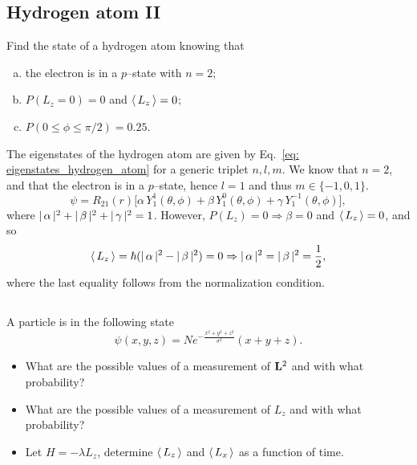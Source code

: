 \subsection{Hydrogen atom II}
Find the state of a hydrogen atom knowing that
\begin{enumerate}[(a)]
    \item the electron is in a $p$--state with $n=2$;
    \item $P(L_z = 0) = 0$ and $\langle \, L_z \, \rangle = 0$;
    \item $P(0 \le \phi \le \pi/2) = 0.25$.
\end{enumerate}
The eigenstates of the hydrogen atom are given by Eq.~\eqref{eq: eigenstates_hydrogen_atom} for a generic triplet $n, l, m$. We know that $n=2$, and that the electron is in a $p$--state, hence $l=1$ and thus $ m \in \{ -1, 0, 1 \} $. 
\begin{equation}
    \psi = R_{21} (r) \bigl[ \alpha \, Y_1^1 (\theta, \phi) + \beta \, Y_1^0 (\theta, \phi) + \gamma \, Y_1^{-1} (\theta, \phi) \bigr],
\end{equation}
where $|\, \alpha \,|^2 + |\, \beta \,|^2 + |\, \gamma \,|^2 = 1$.
However, $P(L_z) = 0 \Rightarrow \beta = 0$ and $ \langle \, L_z \, \rangle = 0 $, and so
\begin{equation}
    \langle \, L_z \, \rangle = \hbar ( |\, \alpha \,|^2 - |\, \beta \,|^2 ) = 0 \Rightarrow |\, \alpha \,|^2 = |\, \beta \,|^2 = \frac{1}{2},
\end{equation}
where the last equality follows from the normalization condition.
\subsection{}
A particle is in the following state
\begin{equation}
    \psi(x, y, z) = N e^{- \frac{x^2 + y^2 + z^2}{\sigma^2} } (x + y + z).
\end{equation}
\begin{itemize}[(a)]
    \item What are the possible values of a measurement of $\mathbf{L}^2$ and with what probability?
    \item What are the possible values of a measurement of $L_z$ and with what probability?
    \item Let $H = -\lambda L_z$, determine $\langle \, L_z \, \rangle$ and $\langle \, L_x \, \rangle$ as a function of time.
\end{itemize}

